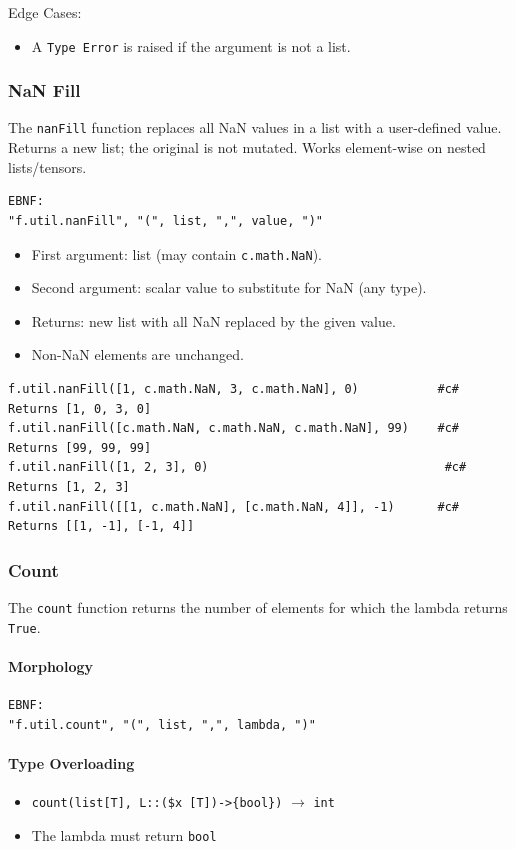 Edge Cases:
\begin{itemize}
\item A \texttt{Type Error} is raised if the argument is not a list.
\end{itemize}

\subsubsection{NaN Fill}
The \texttt{nanFill} function replaces all NaN values in a list with a user-defined value. Returns a new list; the original is not mutated. Works element-wise on nested lists/tensors.
\begin{verbatim}
EBNF:
"f.util.nanFill", "(", list, ",", value, ")"
\end{verbatim}
\begin{itemize}
\item First argument: list (may contain \texttt{c.math.NaN}).
\item Second argument: scalar value to substitute for NaN (any type).
\item Returns: new list with all NaN replaced by the given value.
\item Non-NaN elements are unchanged.
\end{itemize}
\begin{verbatim}
f.util.nanFill([1, c.math.NaN, 3, c.math.NaN], 0)           #c# Returns [1, 0, 3, 0]
f.util.nanFill([c.math.NaN, c.math.NaN, c.math.NaN], 99)    #c# Returns [99, 99, 99]
f.util.nanFill([1, 2, 3], 0)                                 #c# Returns [1, 2, 3]
f.util.nanFill([[1, c.math.NaN], [c.math.NaN, 4]], -1)      #c# Returns [[1, -1], [-1, 4]]
\end{verbatim}

\subsubsection{Count}
The \texttt{count} function returns the number of elements for which the lambda returns \texttt{True}.

\paragraph{Morphology}
\begin{verbatim}
EBNF:
"f.util.count", "(", list, ",", lambda, ")"
\end{verbatim}

\paragraph{Type Overloading}
\begin{itemize}
\item \texttt{count(list[T], L::(\$x [T])->\{bool\})} $\rightarrow$ \texttt{int}
\item The lambda must return \texttt{bool}
\end{itemize}

